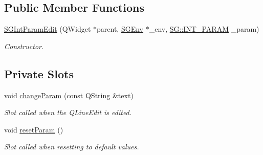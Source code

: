 \subsection*{Public Member Functions}
\begin{DoxyCompactItemize}
\item 
\mbox{\label{classSGIntParamEdit_a3029714bc0bb212195a197eb7a2e68bb}} 
\hyperlink{classSGIntParamEdit_a3029714bc0bb212195a197eb7a2e68bb}{S\+G\+Int\+Param\+Edit} (Q\+Widget $\ast$parent, \hyperlink{classSGEnv}{S\+G\+Env} $\ast$\+\_\+env, \hyperlink{namespaceSG_a031898e6fc0fa14d8590f85da9715f37}{S\+G\+::\+I\+N\+T\+\_\+\+P\+A\+R\+AM} \+\_\+param)
\begin{DoxyCompactList}\small\item\em Constructor. \end{DoxyCompactList}\end{DoxyCompactItemize}
\subsection*{Private Slots}
\begin{DoxyCompactItemize}
\item 
\mbox{\label{classSGIntParamEdit_a15b46d944e6908ec0e1516419f522954}} 
void \hyperlink{classSGIntParamEdit_a15b46d944e6908ec0e1516419f522954}{change\+Param} (const Q\+String \&text)
\begin{DoxyCompactList}\small\item\em Slot called when the Q\+Line\+Edit is edited. \end{DoxyCompactList}\item 
\mbox{\label{classSGIntParamEdit_ac9e1dba5585ebc921169deee8373a9c9}} 
void \hyperlink{classSGIntParamEdit_ac9e1dba5585ebc921169deee8373a9c9}{reset\+Param} ()
\begin{DoxyCompactList}\small\item\em Slot called when resetting to default values. \end{DoxyCompactList}\end{DoxyCompactItemize}

